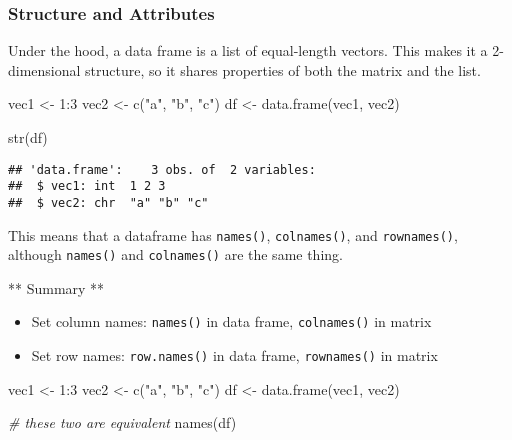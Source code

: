 \documentclass[
]{book}
\newenvironment{Shaded}{\begin{snugshade}}{\end{snugshade}}
\newcommand{\CommentTok}[1]{\textcolor[rgb]{0.56,0.35,0.01}{\textit{#1}}}
\newcommand{\DecValTok}[1]{\textcolor[rgb]{0.00,0.00,0.81}{#1}}
\newcommand{\FunctionTok}[1]{\textcolor[rgb]{0.00,0.00,0.00}{#1}}
\newcommand{\NormalTok}[1]{#1}
\newcommand{\OtherTok}[1]{\textcolor[rgb]{0.56,0.35,0.01}{#1}}
\newcommand{\SpecialCharTok}[1]{\textcolor[rgb]{0.00,0.00,0.00}{#1}}
\newcommand{\StringTok}[1]{\textcolor[rgb]{0.31,0.60,0.02}{#1}}
\providecommand{\tightlist}{%
  \setlength{\itemsep}{0pt}\setlength{\parskip}{0pt}}
\begin{document}
\hypertarget{structure-and-attributes}{%
\subsubsection{Structure and Attributes}\label{structure-and-attributes}}

Under the hood, a data frame is a list of equal-length vectors. This makes it a 2-dimensional structure, so it shares properties of both the matrix and the list.

\begin{Shaded}
\begin{Highlighting}[]
\NormalTok{vec1 }\OtherTok{\textless{}{-}} \DecValTok{1}\SpecialCharTok{:}\DecValTok{3}
\NormalTok{vec2 }\OtherTok{\textless{}{-}} \FunctionTok{c}\NormalTok{(}\StringTok{"a"}\NormalTok{, }\StringTok{"b"}\NormalTok{, }\StringTok{"c"}\NormalTok{)}
\NormalTok{df }\OtherTok{\textless{}{-}} \FunctionTok{data.frame}\NormalTok{(vec1, vec2)}

\FunctionTok{str}\NormalTok{(df)}
\end{Highlighting}
\end{Shaded}

\begin{verbatim}
## 'data.frame':    3 obs. of  2 variables:
##  $ vec1: int  1 2 3
##  $ vec2: chr  "a" "b" "c"
\end{verbatim}

This means that a dataframe has \texttt{names()}, \texttt{colnames()}, and \texttt{rownames()}, although \texttt{names()} and \texttt{colnames()} are the same thing.

** Summary **

\begin{itemize}
\tightlist
\item
  Set column names: \texttt{names()} in data frame, \texttt{colnames()} in matrix
\item
  Set row names: \texttt{row.names()} in data frame, \texttt{rownames()} in matrix
\end{itemize}

\begin{Shaded}
\begin{Highlighting}[]
\NormalTok{vec1 }\OtherTok{\textless{}{-}} \DecValTok{1}\SpecialCharTok{:}\DecValTok{3}
\NormalTok{vec2 }\OtherTok{\textless{}{-}} \FunctionTok{c}\NormalTok{(}\StringTok{"a"}\NormalTok{, }\StringTok{"b"}\NormalTok{, }\StringTok{"c"}\NormalTok{)}
\NormalTok{df }\OtherTok{\textless{}{-}} \FunctionTok{data.frame}\NormalTok{(vec1, vec2)}

\CommentTok{\# these two are equivalent}
\FunctionTok{names}\NormalTok{(df)}
\end{Highlighting}
\end{Shaded}
\end{document}
